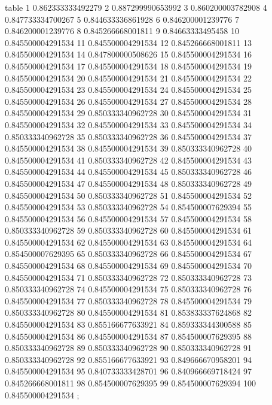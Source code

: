 \nextgroupplot[title=Seed 10,
height=\figheight,
legend cell align={left},
legend columns=-1,
legend style={
  fill opacity=0.8,
  draw opacity=1,
  text opacity=1,
  at={(-0.20,1.36)},%
  anchor=south west,
  draw=white!80!black
},
minor xtick={25, 75},
minor ytick={},
tick align=outside,
tick pos=left,
width=\figwidth,
x grid style={white!69.0196078431373!black},
xlabel={Eval. Steps},
xminorgrids,
xmajorgrids,
xmin=-3.95, xmax=104.95,
xtick style={color=black},
xtick={-25,0,50,100,125},
xticklabels={-25,0,50,100,125},
y grid style={white!69.0196078431373!black},
ylabel={ACC (\%)},
ymajorgrids,
ymin=0.83, ymax=0.89,
ytick style={color=black},
ytick={0.83,0.84,0.85,0.86,0.87,0.88,0.89},
yticklabels={83,84,85,86,87,88,89}
]
table {%
1 0.862333333492279
2 0.887299990653992
3 0.860200003782908
4 0.847733334700267
5 0.844633336861928
6 0.846200001239776
7 0.846200001239776
8 0.845266668001811
9 0.84663333495458
10 0.845500004291534
11 0.845500004291534
12 0.845266668001811
13 0.845500004291534
14 0.847800000508626
15 0.845500004291534
16 0.845500004291534
17 0.845500004291534
18 0.845500004291534
19 0.845500004291534
20 0.845500004291534
21 0.845500004291534
22 0.845500004291534
23 0.845500004291534
24 0.845500004291534
25 0.845500004291534
26 0.845500004291534
27 0.845500004291534
28 0.845500004291534
29 0.850333340962728
30 0.845500004291534
31 0.845500004291534
32 0.845500004291534
33 0.845500004291534
34 0.850333340962728
35 0.850333340962728
36 0.845500004291534
37 0.845500004291534
38 0.845500004291534
39 0.850333340962728
40 0.845500004291534
41 0.850333340962728
42 0.845500004291534
43 0.845500004291534
44 0.845500004291534
45 0.850333340962728
46 0.845500004291534
47 0.845500004291534
48 0.850333340962728
49 0.845500004291534
50 0.850333340962728
51 0.845500004291534
52 0.845500004291534
53 0.850333340962728
54 0.854500007629394
55 0.845500004291534
56 0.845500004291534
57 0.845500004291534
58 0.850333340962728
59 0.850333340962728
60 0.845500004291534
61 0.845500004291534
62 0.845500004291534
63 0.845500004291534
64 0.854500007629395
65 0.850333340962728
66 0.845500004291534
67 0.845500004291534
68 0.845500004291534
69 0.845500004291534
70 0.845500004291534
71 0.850333340962728
72 0.850333340962728
73 0.850333340962728
74 0.845500004291534
75 0.850333340962728
76 0.845500004291534
77 0.850333340962728
78 0.845500004291534
79 0.850333340962728
80 0.845500004291534
81 0.853833337624868
82 0.845500004291534
83 0.855166677633921
84 0.859333344300588
85 0.845500004291534
86 0.845500004291534
87 0.854500007629395
88 0.850333340962728
89 0.850333340962728
90 0.850333340962728
91 0.850333340962728
92 0.855166677633921
93 0.849666670958201
94 0.845500004291534
95 0.840733333428701
96 0.840966669718424
97 0.845266668001811
98 0.854500007629395
99 0.854500007629394
100 0.845500004291534
};
